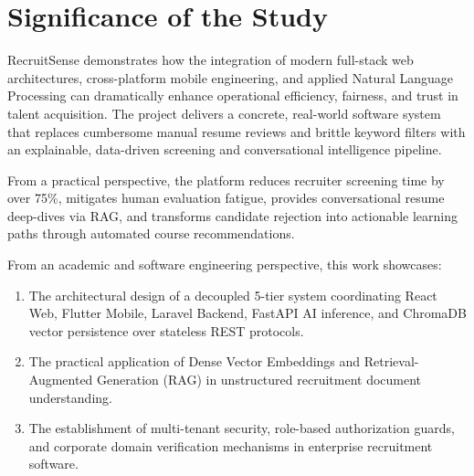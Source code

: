 \section{Significance of the Study}
RecruitSense demonstrates how the integration of modern full-stack web architectures, cross-platform mobile engineering, and applied Natural Language Processing can dramatically enhance operational efficiency, fairness, and trust in talent acquisition. The project delivers a concrete, real-world software system that replaces cumbersome manual resume reviews and brittle keyword filters with an explainable, data-driven screening and conversational intelligence pipeline.

From a practical perspective, the platform reduces recruiter screening time by over 75\%, mitigates human evaluation fatigue, provides conversational resume deep-dives via RAG, and transforms candidate rejection into actionable learning paths through automated course recommendations.

From an academic and software engineering perspective, this work showcases:
\begin{enumerate}
    \item The architectural design of a decoupled 5-tier system coordinating React Web, Flutter Mobile, Laravel Backend, FastAPI AI inference, and ChromaDB vector persistence over stateless REST protocols.
    \item The practical application of Dense Vector Embeddings and Retrieval-Augmented Generation (RAG) in unstructured recruitment document understanding.
    \item The establishment of multi-tenant security, role-based authorization guards, and corporate domain verification mechanisms in enterprise recruitment software.
\end{enumerate}

